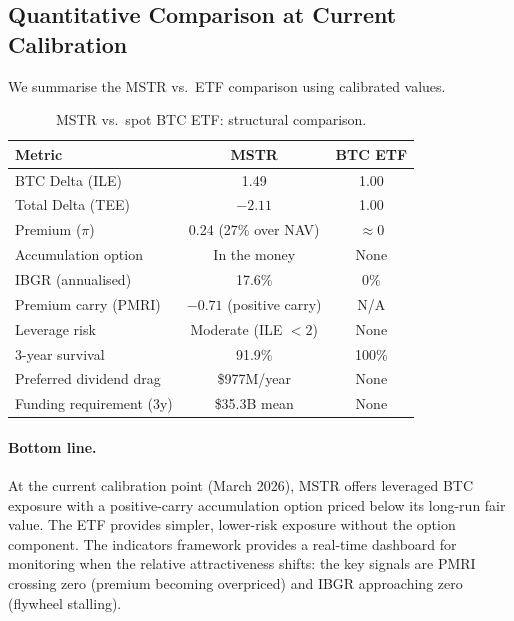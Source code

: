 \subsection{Quantitative Comparison at Current Calibration}

We summarise the MSTR vs.\ ETF comparison using calibrated values.

\begin{table}[ht]
\centering
\caption{MSTR vs.\ spot BTC ETF: structural comparison.}
\label{tab:mstr-vs-etf}
\begin{tabular}{@{}lcc@{}}
\toprule
\textbf{Metric} & \textbf{MSTR} & \textbf{BTC ETF} \\
\midrule
BTC Delta (ILE) & 1.49 & 1.00 \\
Total Delta (TEE) & $-2.11$ & 1.00 \\
Premium ($\pi$) & 0.24 (27\% over NAV) & $\approx 0$ \\
Accumulation option & In the money & None \\
IBGR (annualised) & 17.6\% & 0\% \\
Premium carry (PMRI) & $-0.71$ (positive carry) & N/A \\
Leverage risk & Moderate (ILE $< 2$) & None \\
3-year survival & 91.9\% & 100\% \\
Preferred dividend drag & \$977M/year & None \\
Funding requirement (3y) & \$35.3B mean & None \\
\bottomrule
\end{tabular}
\end{table}

\paragraph{Bottom line.}
At the current calibration point (March 2026), MSTR offers leveraged BTC
exposure with a positive-carry accumulation option priced below its
long-run fair value.  The ETF provides simpler, lower-risk exposure
without the option component.  The indicators framework provides a
real-time dashboard for monitoring when the relative attractiveness shifts:
the key signals are PMRI crossing zero (premium becoming overpriced) and
IBGR approaching zero (flywheel stalling).
